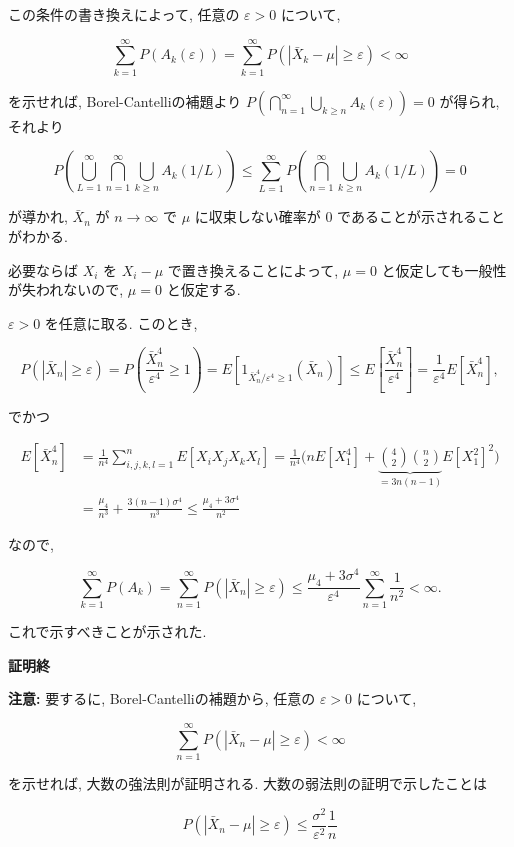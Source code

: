 \documentclass[
  letterpaper,
  DIV=11,
  numbers=noendperiod]{scrartcl}
\begin{document}
この条件の書き換えによって, 任意の \(\varepsilon>0\) について,

\[
\sum_{k=1}^\infty P(A_k(\varepsilon)) = \sum_{k=1}^\infty P(|\bar{X}_k-\mu|\ge\varepsilon) < \infty
\]

を示せれば, Borel-Cantelliの補題より
\(P\left(\bigcap_{n=1}^\infty \bigcup_{k\ge n} A_k(\varepsilon)\right) = 0\)
が得られ, それより

\[
P\left(\bigcup_{L=1}^\infty \bigcap_{n=1}^\infty \bigcup_{k\ge n} A_k(1/L)\right)
\le \sum_{L=1}^\infty P\left(\bigcap_{n=1}^\infty \bigcup_{k\ge n} A_k(1/L)\right)
=0
\]

が導かれ, \(\bar{X}_n\) が \(n\to\infty\) で \(\mu\) に収束しない確率が
\(0\) であることが示されることがわかる.

必要ならば \(X_i\) を \(X_i-\mu\) で置き換えることによって, \(\mu=0\)
と仮定しても一般性が失われないので, \(\mu=0\) と仮定する.

\(\varepsilon>0\) を任意に取る. このとき,

\[
P(|\bar{X}_n|\ge\varepsilon) =
P\left(\frac{\bar{X}_n^4}{\varepsilon^4}\ge 1\right) =
E\left[1_{\bar{X}_n^4/\varepsilon^4\ge 1}(\bar{X}_n)\right] \le
E\left[\frac{\bar{X}_n^4}{\varepsilon^4}\right] =
\frac{1}{\varepsilon^4}E\left[\bar{X}_n^4\right],
\]

でかつ

\[
\begin{aligned}
E\left[\bar{X}_n^4\right] &=
\frac{1}{n^4}\sum_{i,j,k,l=1}^n E[X_i X_j X_k X_l] =
\frac{1}{n^4}\biggl(
n E[X_1^4] + \underbrace{\binom{4}{2}\binom{n}{2}}_{=3n(n-1)} E[X_1^2]^2
\biggr)
\\ &=
\frac{\mu_4}{n^3} + \frac{3(n-1)\sigma^4}{n^3} \le
\frac{\mu_4 + 3\sigma^4}{n^2}
\end{aligned}
\]

なので,

\[
\sum_{k=1}^\infty P(A_k) =
\sum_{n=1}^\infty P(|\bar{X}_n|\ge\varepsilon) \le
\frac{\mu_4 + 3\sigma^4}{\varepsilon^4}\sum_{n=1}^\infty \frac{1}{n^2} < \infty.
\]

これで示すべきことが示された.

\textbf{証明終}

\textbf{注意:} 要するに, Borel-Cantelliの補題から, 任意の
\(\varepsilon> 0\) について,

\[
\sum_{n=1}^\infty P(|\bar{X}_n-\mu|\ge\varepsilon) < \infty
\]

を示せれば, 大数の強法則が証明される. 大数の弱法則の証明で示したことは

\[
P(|\bar{X}_n-\mu|\ge\varepsilon) \le \frac{\sigma^2}{\varepsilon^2}\frac{1}{n}
\]
\end{document}
